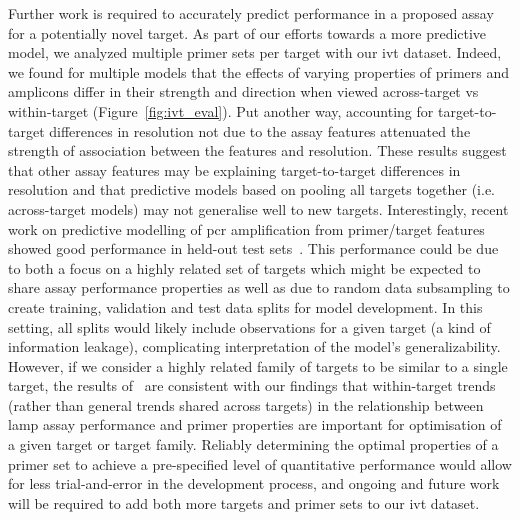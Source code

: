 \documentclass[../thesis.tex]{subfiles}
\begin{document}
Further work is required to accurately predict performance in a proposed assay for a potentially novel target. As part of our efforts towards a more predictive model, we analyzed multiple primer sets per target with our \gls{ivt}  dataset. Indeed, we found for multiple models that the effects of varying properties of primers and amplicons differ in their strength and direction when viewed across-target vs within-target (Figure~\ref{fig:ivt_eval}). Put another way, accounting for target-to-target differences in resolution not due to the assay features attenuated the strength of association between the features and resolution. These results suggest that other assay features may be explaining target-to-target differences in resolution and that predictive models based on pooling all targets together (i.e. across-target models) may not generalise well to new targets. Interestingly, recent work on predictive modelling of \gls{pcr} amplification from primer/target features showed good performance in held-out test sets~\citep{doring_modeling_2019}. This performance could be due to both a focus on a highly related set of targets which might be expected to share assay performance properties as well as due to random data subsampling to create training, validation and test data splits for model development. In this setting, all splits would likely include observations for a given target (a kind of information leakage), complicating interpretation of the model's generalizability. However, if we consider a highly related family of targets to be similar to a single target, the results of~\citet{doring_modeling_2019} are consistent with our findings that within-target trends (rather than general trends shared across targets) in the relationship between \gls{lamp} assay performance and primer properties are important for optimisation of a given target or target family. Reliably determining the optimal properties of a primer set to achieve a pre-specified level of quantitative performance would allow for less trial-and-error in the development process, and ongoing and future work will be required to add both more targets and primer sets to our \gls{ivt}  dataset.
\end{document}
